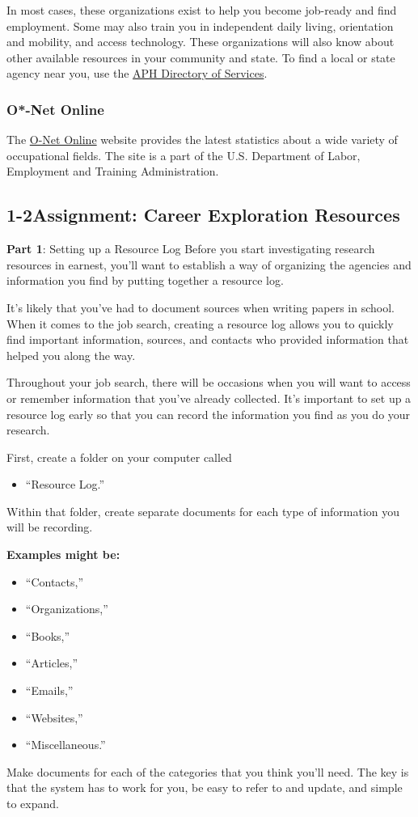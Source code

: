 In most cases, these organizations exist to help you become job-ready and find employment. Some may also train you in independent daily living, orientation and mobility, and access technology. These organizations will also know about other available resources in your community and state. To find a local or state agency near you, use the \href{https://aphcareerconnect.org/directory/about-the-aph-directory-of-services/}{APH Directory of Services}.
\subsubsection*{O*-Net Online}
The \href{https://www.onetonline.org/}{O-Net Online} website provides the latest statistics about a wide variety of occupational fields. The site is a part of the U.S. Department of Labor, Employment and Training Administration.

\pagebreak \subsection*{1-2\quad Assignment: Career Exploration Resources}
\textbf{Part 1}: Setting up a Resource Log Before you start investigating research resources in earnest, you'll want to establish a way of organizing the agencies and information you find by putting together a resource log.

It's likely that you've had to document sources when writing papers in school. When it comes to the job search, creating a resource log allows you to quickly find important information, sources, and contacts who provided information that helped you along the way.

Throughout your job search, there will be occasions when you will want to access or remember information that you've already collected. It's important to set up a resource log early so that you can record the information you find as you do your research.

First, create a folder on your computer called 
\begin{itemize}[leftmargin=*]
\item ``Resource Log.'' 
\end{itemize}

Within that folder, create separate documents for each type of information you will be recording. 

\textbf{Examples might be: }
\begin{itemize}[leftmargin=*]
\item ``Contacts,'' 
\item ``Organizations,'' 
\item ``Books,'' 
\item ``Articles,'' 
\item ``Emails,'' 
\item ``Websites,'' 
\item ``Miscellaneous.'' 
\end{itemize}
Make documents for each of the categories that you think you'll need. The key is that the system has to work for you, be easy to refer to and update, and simple to expand.

